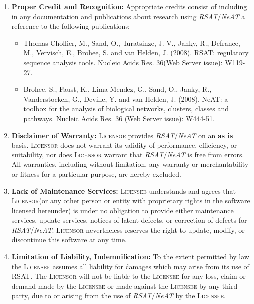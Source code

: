 \documentclass[12pt]{article}
\newcommand{\RSAT}[0]{\emph{RSAT}\xspace}
\newcommand{\NeAT}[0]{\emph{NeAT}\xspace}
\newcommand{\Licensor}[0]{\textsc{Licensor}\xspace}
\newcommand{\Licensee}[0]{\textsc{Licensee}\xspace}
\newcommand{\Paragraph}[2]{\item \textbf{#1:} #2}
\begin{document}
\begin{enumerate}
  \Paragraph{Proper Credit and Recognition}{Appropriate credits consist 
    of including in any documentation and publications about research
    using \RSAT/\NeAT a reference to the following publications: 
    \begin{itemize}
    \item [\RSAT] Thomas-Chollier, M., Sand, O., Turatsinze, J. V., Janky, R.,
      Defrance, M., Vervisch, E., Brohee, S. and van Helden,
      J. (2008). RSAT: regulatory sequence analysis tools. Nucleic Acids
      Res. 36(Web Server issue): W119-27.  
    \item [\NeAT]  Brohee, S., Faust, K., Lima-Mendez, G., Sand, O., Janky, R., Vanderstocken, G., 
      Deville, Y. and van Helden, J. (2008). NeAT: a toolbox for the analysis of biological
      networks, clusters, classes and pathways. Nucleic Acids Res. 36 (Web Server issue): 
      W444-51.
    \end{itemize}
  }

  \Paragraph{Disclaimer of Warranty}{\Licensor provides \RSAT/\NeAT 
    on an \textbf{as is} basis. \Licensor does not warrant its validity of 
    performance, efficiency, or suitability, nor does \Licensor warrant 
    that \RSAT/\NeAT is free from errors. All warranties, 
    including without limitation, any warranty or merchantability or 
    fitness for a particular purpose, are hereby excluded.
  }

  \Paragraph{Lack of Maintenance Services}{\Licensee understands and 
    agrees that \Licensor (or any other person or entity with proprietary
    rights in the software licensed hereunder) is under no obligation to
    provide either maintenance services, update services, notices of
    latent defects, or correction of defects for \RSAT/\NeAT.  \Licensor
    nevertheless reserves the right to update, modify, or discontinue this
    software at any time.  }

  \Paragraph{Limitation of Liability, Indemnification}{
    To the extent permitted by law the \Licensee assumes all liability for
    damages which may arise from its use of RSAT. The \Licensor will not
    be liable to the \Licensee for any loss, claim or demand made by the
    \Licensee or made against the \Licensee by any third party, due to or
    arising from the use of \RSAT/\NeAT by the \Licensee.

}
\end{enumerate}
\end{document}
